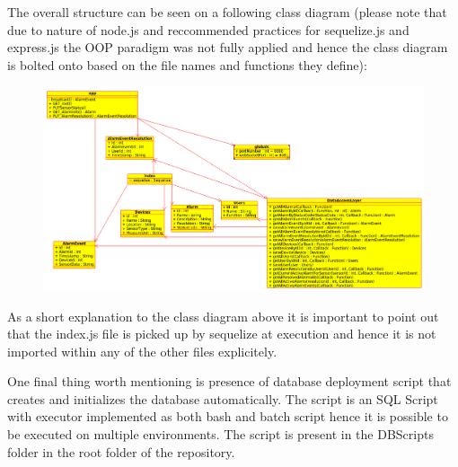 The overall structure can be seen on a following class diagram (please note that due to nature of node.js and reccommended practices for sequelize.js and express.js the OOP paradigm was not fully applied and hence the class diagram is bolted onto based on the file names and functions they define):
\bigskip
\begin{figure}[H]
\centering
\includegraphics[scale=0.3]{gfx/class}
\end{figure}
\smallskip
As a short explanation to the class diagram above it is important to point out that the index.js file is picked up by sequelize at execution and hence it is not imported within any of the other files explicitely.

\smallskip

One final thing worth mentioning is presence of database deployment script that creates and initializes the database automatically. The script is an SQL Script with executor implemented as both bash and batch script hence it is possible to be executed on multiple environments. The script is present in the DBScripts folder in the root folder of the repository.
